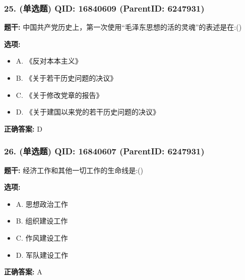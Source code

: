 \documentclass[12pt,UTF8]{ctexart}
\begin{document}
\subsubsection*{25. (单选题) \small QID: 16840609 (ParentID: 6247931)}

\textbf{题干:}
中国共产党历史上，第一次使用“毛泽东思想的活的灵魂”的表述是在:()



\textbf{选项:}
\begin{itemize}[leftmargin=*]

  \item A. 《反对本本主义》

  \item B. 《关于若干历史问题的决议》

  \item C. 《关于修改党章的报告》

  \item D. 《关于建国以来党的若干历史问题的决议》

\end{itemize}

\textbf{正确答案:}
D

\vspace{0.3em}\hrulefill\vspace{0.7em}

\subsubsection*{26. (单选题) \small QID: 16840607 (ParentID: 6247931)}

\textbf{题干:}
经济工作和其他一切工作的生命线是:()



\textbf{选项:}
\begin{itemize}[leftmargin=*]

  \item A. 思想政治工作

  \item B. 组织建设工作

  \item C. 作风建设工作

  \item D. 军队建设工作

\end{itemize}

\textbf{正确答案:}
A

\vspace{0.3em}\hrulefill\vspace{0.7em}
\end{document}

